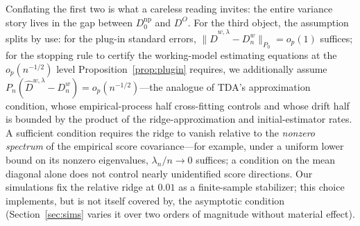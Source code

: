 \documentclass[11pt]{article}
\theoremstyle{remark}
\newcommand{\Pn}{P_n}
\begin{document}
Conflating the first two is what a careless reading invites: the entire variance story lives in the gap between $D^{\mathrm{np}}_0$ and $D^{O}$. For the third object, the assumption splits by use: for the plug-in standard errors, $\|\widehat D^{w,\lambda} - D^{w}_n\|_{P_0} = o_p(1)$ suffices; for the stopping rule to certify the working-model estimating equations at the $o_p(n^{-1/2})$ level Proposition~\ref{prop:plugin} requires, we additionally assume $\Pn(\widehat D^{w,\lambda} - D^{w}_n) = o_p(n^{-1/2})$---the analogue of TDA's approximation condition, whose empirical-process half cross-fitting controls and whose drift half is bounded by the product of the ridge-approximation and initial-estimator rates. A sufficient condition requires the ridge to vanish relative to the \emph{nonzero spectrum} of the empirical score covariance---for example, under a uniform lower bound on its nonzero eigenvalues, $\lambda_n/n \to 0$ suffices; a condition on the mean diagonal alone does not control nearly unidentified score directions. Our simulations fix the relative ridge at $0.01$ as a finite-sample stabilizer; this choice implements, but is not itself covered by, the asymptotic condition (Section~\ref{sec:sims} varies it over two orders of magnitude without material effect).
\end{document}
